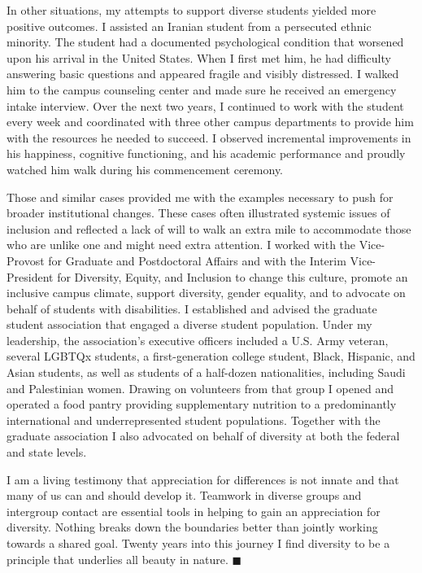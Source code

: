 \documentclass[11pt,letterpaper]{article}
\begin{document}
\begin{multicols}{3}
In other situations, my attempts to support diverse students yielded more positive outcomes. I assisted an Iranian student from a persecuted ethnic minority. The student had a documented psychological condition that worsened upon his arrival in the United States. When I first met him, he had difficulty answering basic questions and appeared fragile and visibly distressed. I walked him to the campus counseling center and made sure he received an emergency intake interview. Over the next two years, I continued to work with the student every week and coordinated with three other campus departments to provide him with the resources he needed to succeed. I observed incremental improvements in his happiness, cognitive functioning, and his academic performance and proudly watched him walk during his commencement ceremony.

Those and similar cases provided me with the examples necessary to push for broader institutional changes. These cases often illustrated systemic issues of inclusion and reflected a lack of will to walk an extra mile to accommodate those who are unlike one and might need extra attention. I worked with the Vice-Provost for Graduate and Postdoctoral Affairs and with the Interim Vice-President for Diversity, Equity, and Inclusion to change this culture, promote an inclusive campus climate, support diversity, gender equality, and to advocate on behalf of students with disabilities. I established and advised the graduate student association that engaged a diverse student population. Under my leadership, the association's executive officers included a U.S. Army veteran, several LGBTQx students, a first-generation college student, Black, Hispanic, and Asian students, as well as students of a half-dozen nationalities, including Saudi and Palestinian women. Drawing on volunteers from that group I opened and operated a food pantry providing supplementary nutrition to a predominantly international and underrepresented student populations. Together with the graduate association I also advocated on behalf of diversity at both the federal and state levels.

I am a living testimony that appreciation for differences is not innate and that many of us can and should develop it. Teamwork in diverse groups and intergroup contact are essential tools in helping to gain an appreciation for diversity. Nothing breaks down the boundaries better than jointly working towards a shared goal. Twenty years into this journey I find diversity to be a principle that underlies all beauty in nature. $\blacksquare$ %


\end{multicols}
\end{document}
